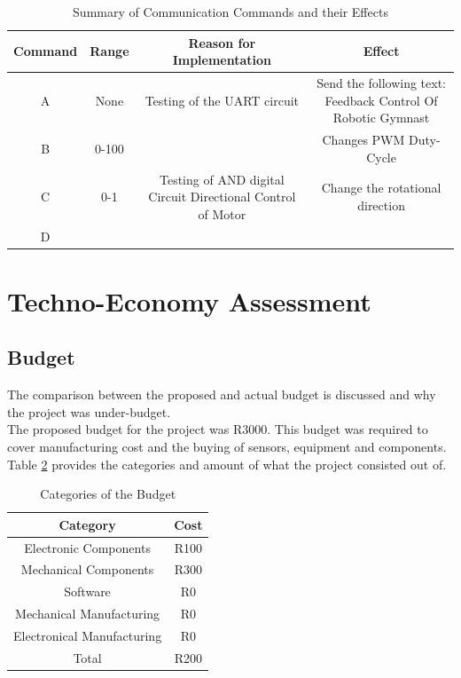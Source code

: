 \begin{table}[h]
	\centering
	\begin{tabular}{|c|c|c|c|}
		\hline
		Command & Range &  Reason for Implementation & Effect \\
		\hline
		\hline
		A & None & Testing of the UART circuit & Send the following text: Feedback Control Of Robotic Gymnast\\
		\hline
		B & 0-100 &  & Changes PWM Duty-Cycle \\
		\hline
		C & 0-1 & Testing of AND digital Circuit Directional Control of Motor & Change the rotational direction \\
		\hline
		D & & & \\
		\hline
	
	\end{tabular}
	\caption{Summary of Communication Commands and their Effects}
	\label{table:uart_commands}

\end{table}


\newpage


%





\section{Techno-Economy Assessment}
\label{sec:techno_eco}

\subsection{Budget}
The comparison between the proposed and actual budget is discussed and why the project was under-budget.\\

The proposed budget for the project was R3000. This budget was required to cover manufacturing cost and the buying of sensors, equipment and components. Table \ref{table:budget} provides the categories and amount of what the project consisted out of.\\

\begin{table}[h]
	\centering
	\begin{tabular}{|c|c|}
		\hline
		Category & Cost \\
		\hline
		\hline
		Electronic Components & R100 \\
		\hline
		Mechanical Components & R300 \\
		\hline 
		Software & R0 \\
		\hline
		Mechanical Manufacturing & R0 \\
		\hline
		Electronical Manufacturing & R0 \\
		\hline
		\hline 
		Total & R200 \\
		\hline
		
	\end{tabular}
	\caption{Categories of the Budget }
	\label{table:budget}
	
\end{table}

